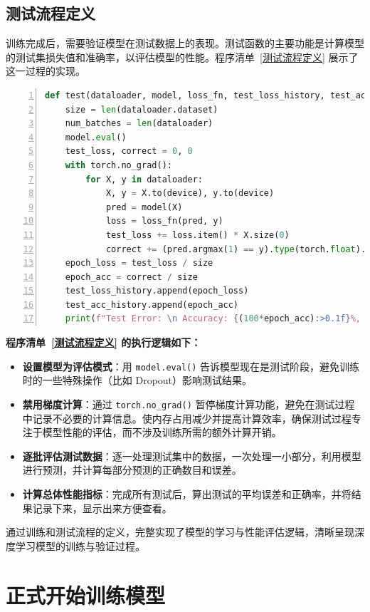 \subsection{测试流程定义}
训练完成后，需要验证模型在测试数据上的表现。测试函数的主要功能是计算模型的测试集损失值和准确率，以评估模型的性能。程序清单~\ref{测试流程定义} 展示了这一过程的实现。

\begin{lstlisting}[language={python},label={测试流程定义},caption={测试流程定义}, basicstyle=\footnotesize\ttfamily, breaklines=true, numbers=left, frame=single]
def test(dataloader, model, loss_fn, test_loss_history, test_acc_history):
    size = len(dataloader.dataset)
    num_batches = len(dataloader)
    model.eval()
    test_loss, correct = 0, 0
    with torch.no_grad():
        for X, y in dataloader:
            X, y = X.to(device), y.to(device)
            pred = model(X)
            loss = loss_fn(pred, y)
            test_loss += loss.item() * X.size(0)
            correct += (pred.argmax(1) == y).type(torch.float).sum().item()
    epoch_loss = test_loss / size
    epoch_acc = correct / size
    test_loss_history.append(epoch_loss)
    test_acc_history.append(epoch_acc)
    print(f"Test Error: \n Accuracy: {(100*epoch_acc):>0.1f}%, Avg loss: {epoch_loss:>8f} \n")
\end{lstlisting}
\textbf{程序清单~\ref{测试流程定义} 的执行逻辑如下：}
\begin{itemize}
    \item \textbf{设置模型为评估模式}：用 \texttt{model.eval()} 告诉模型现在是测试阶段，避免训练时的一些特殊操作（比如 Dropout）影响测试结果。
    \item \textbf{禁用梯度计算}：通过 \texttt{torch.no\_grad()} 暂停梯度计算功能，避免在测试过程中记录不必要的计算信息。使内存占用减少并提高计算效率，确保测试过程专注于模型性能的评估，而不涉及训练所需的额外计算开销。
    \item \textbf{逐批评估测试数据}：逐一处理测试集中的数据，一次处理一小部分，利用模型进行预测，并计算每部分预测的正确数目和误差。
    \item \textbf{计算总体性能指标}：完成所有测试后，算出测试的平均误差和正确率，并将结果记录下来，显示出来方便查看。
\end{itemize}

通过训练和测试流程的定义，完整实现了模型的学习与性能评估逻辑，清晰呈现深度学习模型的训练与验证过程。
\section{正式开始训练模型}

